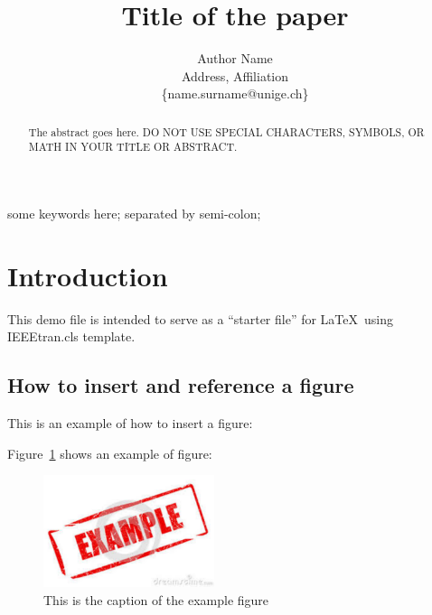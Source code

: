 \documentclass[10pt, conference, compsocconf]{IEEEtran}
\begin{document}
%
\title{Title of the paper}




% 
\author{Author Name \\
Address, Affiliation \\
 \{name.surname@unige.ch\}}



\maketitle


\begin{abstract}
The abstract goes here. DO NOT USE SPECIAL CHARACTERS, SYMBOLS, OR MATH IN YOUR TITLE OR ABSTRACT.


\end{abstract}


\begin{IEEEkeywords}
some keywords here; separated by semi-colon;


\end{IEEEkeywords}


\IEEEpeerreviewmaketitle


\section{Introduction}\label{sec:rintroduction}

This demo file is intended to serve as a ``starter file'' for  \LaTeX\ using
IEEEtran.cls template.

\subsection{How to insert and reference a figure}

This is an example of how to insert a figure:

Figure~\ref{fig:example} shows an example of figure:

\begin{figure}[th]
   \begin{center}
       \includegraphics[width=5cm]{imgs/example.pdf}
	\end{center}
	\caption{This is the caption of the example figure}
	\label{fig:example}
\end{figure}
\end{document}
